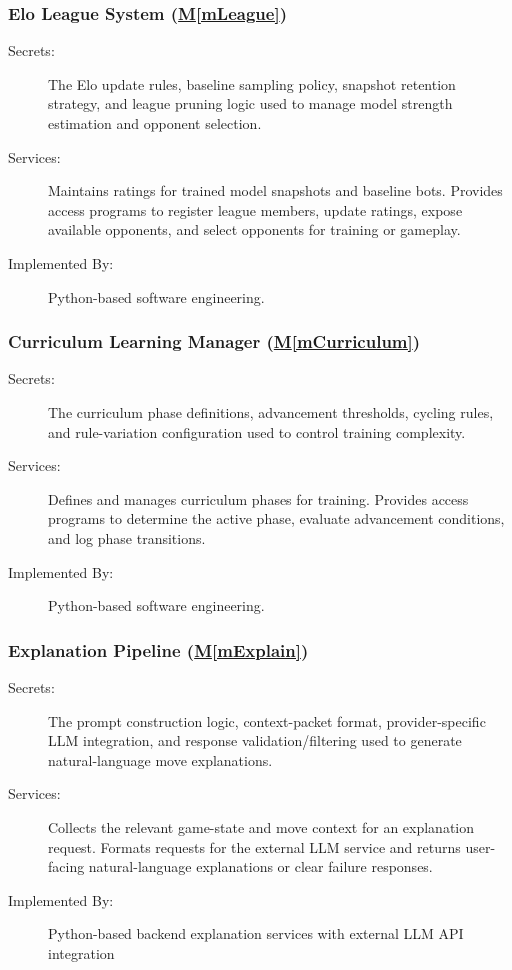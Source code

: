 \documentclass[12pt, titlepage]{article}
\newcommand{\mref}[1]{\hyperref[sec:#1]{M\ref*{#1}}}
\begin{document}
\subsubsection{Elo League System (\mref{mLeague})} \label{sec:mLeague}
\begin{description}
\item[Secrets:] The Elo update rules, baseline sampling policy, snapshot retention strategy, and league pruning logic used to manage model strength estimation and opponent selection.
\item[Services:] Maintains ratings for trained model snapshots and baseline bots.
Provides access programs to register league members, update ratings, expose available opponents, and select opponents for training or gameplay.
\item[Implemented By:] Python-based software engineering.
\end{description}

\subsubsection{Curriculum Learning Manager (\mref{mCurriculum})} \label{sec:mCurriculum}
\begin{description}
\item[Secrets:] The curriculum phase definitions, advancement thresholds, cycling rules, and rule-variation configuration used to control training complexity.
\item[Services:] Defines and manages curriculum phases for training.
Provides access programs to determine the active phase, evaluate advancement conditions, and log phase transitions.
\item[Implemented By:] Python-based software engineering.
\end{description}

\subsubsection{Explanation Pipeline (\mref{mExplain})} \label{sec:mExplain}
\begin{description}
\item[Secrets:] The prompt construction logic, context-packet format, provider-specific LLM integration, and response validation/filtering used to generate natural-language move explanations.
\item[Services:] Collects the relevant game-state and move context for an explanation request.
Formats requests for the external LLM service and returns user-facing natural-language explanations or clear failure responses.
\item[Implemented By:] Python-based backend explanation services with external LLM API integration
\end{description}
\end{document}
